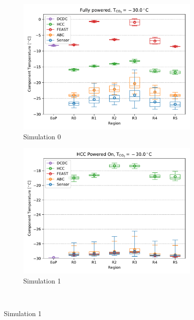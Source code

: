 \begin{figure}[ht!]
\begin{subfigure}[t]{0.50\textwidth}\includegraphics[width=0.99\linewidth]{figures/FEA_20171207_m30p0C_0p0Wm2C_DP1_ALL_S0.pdf}\vspace{-3mm}\caption{Simulation 0}\end{subfigure}
\begin{subfigure}[t]{0.50\textwidth}\includegraphics[width=0.99\linewidth]{figures/FEA_20171207_m30p0C_0p0Wm2C_DP1_ALL_S1.pdf}\vspace{-3mm}\caption{Simulation 1}\end{subfigure}\vspace{5mm}\\ 

\end{figure}
